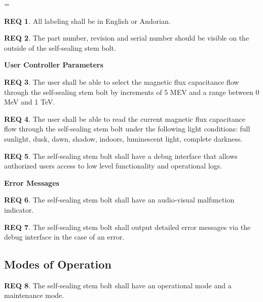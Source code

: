 \documentclass[a4paper,12pt]{article}
\theoremstyle{definition}
\newtheorem{theorem}{REQ}
\newenvironment{subtheorems}{%
  \savedtheorem=\value{theorem}%
  \edef\prevthetheorem{\thetheorem}%
  \setcounter{theorem}{0}%
  \renewcommand\thetheorem{\prevthetheorem.\arabic{theorem}}%
}
{%
  \setcounter{theorem}{\savedtheorem}%
}
\begin{document}
\begin{subtheorems}
	\begin{theorem}
		All labeling shall be in English or Andorian.
	\end{theorem}

	\begin{theorem}
		The part number, revision and serial number should be visible on the outside of the self-sealing stem bolt.
	\end{theorem}

	\noindent\textbf{\large{User Controller Parameters}}

	\begin{theorem}
		The user shall be able to select the magnetic flux capacitance flow through the self-sealing stem bolt by increments of 5 MEV and a range between 0 MeV and 1 TeV.
	\end{theorem}

	\begin{theorem}
		The user shall be able to read the current magnetic flux capacitance flow through the self-sealing stem bolt under the following light conditions: full sunlight, dusk, dawn, shadow, indoors, luminescent light, complete darkness.
	\end{theorem}

	\begin{theorem}
		The self-sealing stem bolt shall have a debug interface that allows authorized users access to
		low level functionality and operational logs.
	\end{theorem}


	\noindent\textbf{\large{Error Messages}}

	\begin{theorem}
		The self-sealing stem bolt shall have an audio-visual malfunction indicator.
	\end{theorem}
	\begin{theorem}
		The self-sealing stem bolt shall output detailed error messages via the debug interface in the case of an error.
	\end{theorem}


\end{subtheorems}

\subsection{Modes of Operation}


\begin{theorem}
	The self-sealing stem bolt shall have an operational mode and a maintenance mode.
\end{theorem}
\end{document}
